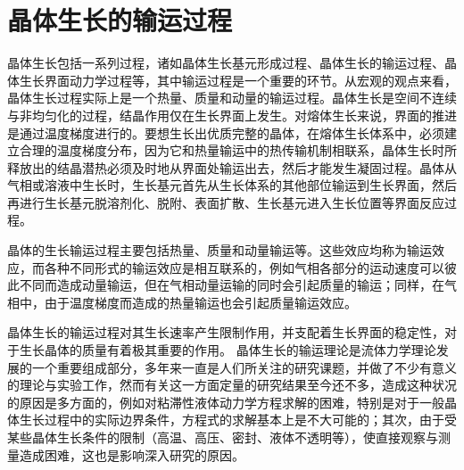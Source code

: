 \section{晶体生长的输运过程}
晶体生长包括一系列过程，诸如晶体生长基元形成过程、晶体生长的输运过程、晶体生长界面动力学过程等，其中输运过程是一个重要的环节。从宏观的观点来看，晶体生长过程实际上是一个热量、质量和动量的输运过程。晶体生长是空间不连续与非均匀化的过程，结晶作用仅在生长界面上发生。对熔体生长来说，界面的推进是通过温度梯度进行的。要想生长出优质完整的晶体，在熔体生长体系中，必须建立合理的温度梯度分布，因为它和热量输运中的热传输机制相联系，晶体生长时所释放出的结晶潜热必须及时地从界面处输运出去，然后才能发生凝固过程。晶体从气相或溶液中生长时，生长基元首先从生长体系的其他部位输运到生长界面，然后再进行生长基元脱溶剂化、脱附、表面扩散、生长基元进入生长位置等界面反应过程。

晶体的生长输运过程主要包括热量、质量和动量输运等。这些效应均称为输运效应，而各种不同形式的输运效应是相互联系的，例如气相各部分的运动速度可以彼此不同而造成动量输运，但在气相动量运输的同时会引起质量的输运；同样，在气相中，由于温度梯度而造成的热量输运也会引起质量输运效应。

晶体生长的输运过程对其生长速率产生限制作用，并支配着生长界面的稳定性，对于生长晶体的质量有着极其重要的作用。
晶体生长的输运理论是流体力学理论发展的一个重要组成部分，多年来一直是人们所关注的研究课题，并做了不少有意义的理论与实验工作，然而有关这一方面定量的研究结果至今还不多，造成这种状况的原因是多方面的，例如对粘滞性液体动力学方程求解的困难，特别是对于一般晶体生长过程中的实际边界条件，方程式的求解基本上是不大可能的；其次，由于受某些晶体生长条件的限制（高温、高压、密封、液体不透明等），使直接观察与测量造成困难，这也是影响深入研究的原因。

